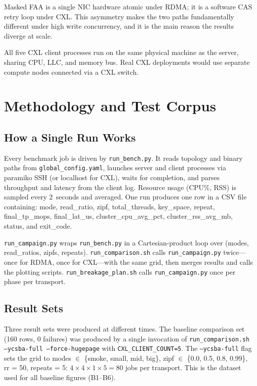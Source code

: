 \documentclass[10pt,twocolumn]{article}
\begin{document}
Masked FAA is a single NIC hardware atomic under RDMA; it is a software CAS
retry loop under CXL.
This asymmetry makes the two paths fundamentally different under high write
concurrency, and it is the main reason the results diverge at scale.

All five CXL client processes run on the same physical machine as the server,
sharing CPU, LLC, and memory bus.
Real CXL deployments would use separate compute nodes connected via a CXL
switch.

\section{Methodology and Test Corpus}
\label{sec:methodology}

\subsection{How a Single Run Works}

Every benchmark job is driven by \texttt{run\_bench.py}.
It reads topology and binary paths from \texttt{global\_config.yaml}, launches
server and client processes via paramiko SSH (or localhost for CXL), waits for
completion, and parses throughput and latency from the client log.
Resource usage (CPU\%, RSS) is sampled every 2~seconds and averaged.
One run produces one row in a CSV file containing: mode, read\_ratio, zipf,
total\_threads, key\_space, repeat, final\_tp\_mops, final\_lat\_us,
cluster\_cpu\_avg\_pct, cluster\_rss\_avg\_mb, status, and exit\_code.

\texttt{run\_campaign.py} wraps \texttt{run\_bench.py} in a Cartesian-product
loop over (modes, read\_ratios, zipfs, repeats).
\texttt{run\_comparison.sh} calls \texttt{run\_campaign.py} twice---once for
RDMA, once for CXL---with the same grid, then merges results and calls the
plotting scripts.
\texttt{run\_breakage\_plan.sh} calls \texttt{run\_campaign.py} once per phase
per transport.

\subsection{Result Sets}

Three result sets were produced at different times.
The baseline comparison set (160 rows, 0 failures) was produced by a single
invocation of \texttt{run\_comparison.sh --ycsba-full --force-hugepage} with
\texttt{CXL\_CLIENT\_COUNT=5}.
The \texttt{--ycsba-full} flag sets the grid to
modes $\in$ \{smoke, small, mid, big\},
zipf $\in$ \{0.0, 0.5, 0.8, 0.99\},
rr = 50, repeats = 5:
$4 \times 4 \times 1 \times 5 = 80$ jobs per transport.
This is the dataset used for all baseline figures (B1--B6).
\end{document}
